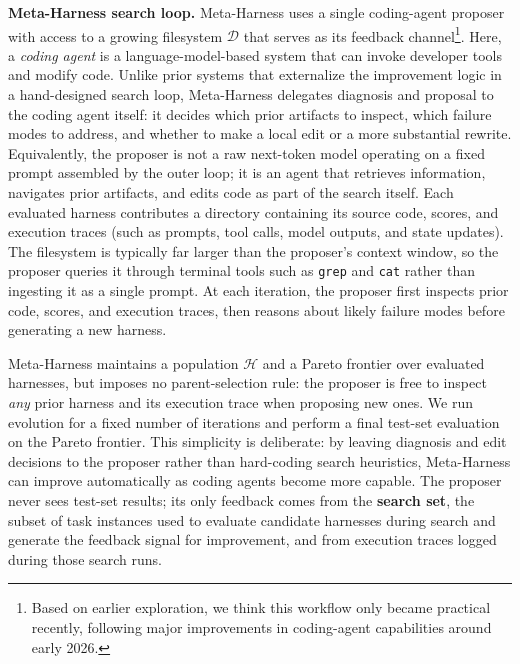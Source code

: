 \textbf{Meta-Harness search loop.}
Meta-Harness uses a single coding-agent proposer with access to a growing filesystem $\mathcal{D}$ that serves as its feedback channel\footnote{Based on earlier exploration, we think this workflow only became practical recently, following major improvements in coding-agent capabilities around early 2026.}.
Here, a \textit{coding agent} is a language-model-based system that can invoke developer tools and modify code.
Unlike prior systems that externalize the improvement logic in a hand-designed search loop, Meta-Harness delegates diagnosis and proposal to the coding agent itself: it decides which prior artifacts to inspect, which failure modes to address, and whether to make a local edit or a more substantial rewrite.
Equivalently, the proposer is not a raw next-token model operating on a fixed prompt assembled by the outer loop; it is an agent that retrieves information, navigates prior artifacts, and edits code as part of the search itself.
Each evaluated harness contributes a directory containing its source code, scores, and execution traces (such as prompts, tool calls, model outputs, and state updates).
The filesystem is typically far larger than the proposer's context window, so the proposer queries it through terminal tools such as \texttt{grep} and \texttt{cat} rather than ingesting it as a single prompt.
At each iteration, the proposer first inspects prior code, scores, and execution traces, then reasons about likely failure modes before generating a new harness.

Meta-Harness maintains a population $\mathcal{H}$ and a Pareto frontier over evaluated harnesses, but imposes no parent-selection rule: the proposer is free to inspect \textit{any} prior harness and its execution trace when proposing new ones.
We run evolution for a fixed number of iterations and perform a final test-set evaluation on the Pareto frontier. This simplicity is deliberate: by leaving diagnosis and edit decisions to the proposer rather than hard-coding search heuristics, Meta-Harness can improve automatically as coding agents become more capable.
The proposer never sees test-set results; its only feedback comes from the \textbf{search set}, the subset of task instances used to evaluate candidate harnesses during search and generate the feedback signal for improvement, and from execution traces logged during those search runs.

